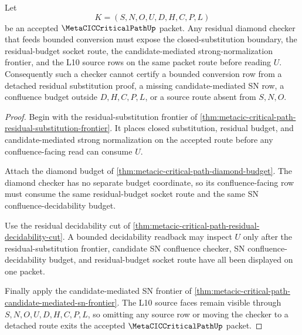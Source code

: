 \begin{theorem}
\label{thm:metacic-critical-path-residual-diamond-source-totality}
Let
$$
K=(S,N,O,U,D,H,C,P,L)
$$
be an accepted $\MetaCICCriticalPathUp$ packet. Any residual diamond checker that feeds bounded conversion must expose the closed-substitution boundary, the residual-budget socket route, the candidate-mediated strong-normalization frontier, and the L10 source rows on the same packet route before reading $U$. Consequently such a checker cannot certify a bounded conversion row from a detached residual substitution proof, a missing candidate-mediated SN row, a confluence budget outside $D,H,C,P,L$, or a source route absent from $S,N,O$.
\end{theorem}
\begin{proof}
Begin with the residual-substitution frontier of \autoref{thm:metacic-critical-path-residual-substitution-frontier}. It places closed substitution, residual budget, and candidate-mediated strong normalization on the accepted route before any confluence-facing read can consume $U$.

Attach the diamond budget of \autoref{thm:metacic-critical-path-diamond-budget}. The diamond checker has no separate budget coordinate, so its confluence-facing row must consume the same residual-budget socket route and the same SN confluence-decidability budget.

Use the residual decidability cut of \autoref{thm:metacic-critical-path-residual-decidability-cut}. A bounded decidability readback may inspect $U$ only after the residual-substitution frontier, candidate SN confluence checker, SN confluence-decidability budget, and residual-budget socket route have all been displayed on one packet.

Finally apply the candidate-mediated SN frontier of \autoref{thm:metacic-critical-path-candidate-mediated-sn-frontier}. The L10 source faces remain visible through $S,N,O,U,D,H,C,P,L$, so omitting any source row or moving the checker to a detached route exits the accepted $\MetaCICCriticalPathUp$ packet.
\end{proof}

